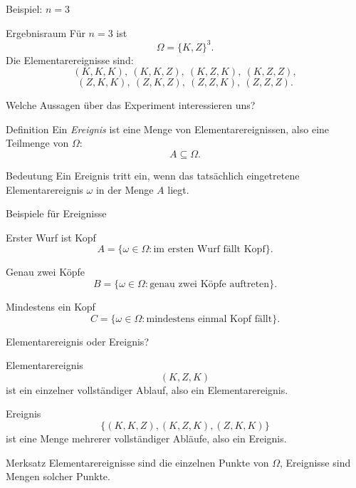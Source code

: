 \documentclass{beamer}
\begin{document}
\begin{frame}{Beispiel: \(n=3\)}
\begin{block}{Ergebnisraum}
Für \(n=3\) ist
\[
\Omega=\{K,Z\}^3.
\]
Die Elementarereignisse sind:
\[
(K,K,K),\ (K,K,Z),\ (K,Z,K),\ (K,Z,Z),
\]
\[
(Z,K,K),\ (Z,K,Z),\ (Z,Z,K),\ (Z,Z,Z).
\]
\end{block}
\end{frame}

\begin{frame}{Welche Aussagen über das Experiment interessieren uns?}
\begin{block}{Definition}
Ein \emph{Ereignis} ist eine Menge von Elementarereignissen, also eine Teilmenge von \(\Omega\):
\[
A\subseteq\Omega.
\]
\end{block}

\begin{block}{Bedeutung}
Ein Ereignis tritt ein, wenn das tatsächlich eingetretene Elementarereignis \(\omega\)
in der Menge \(A\) liegt.
\end{block}
\end{frame}

\begin{frame}{Beispiele für Ereignisse}
\begin{block}{Erster Wurf ist Kopf}
\[
A=\{\omega\in\Omega : \text{im ersten Wurf fällt Kopf}\}.
\]
\end{block}

\begin{block}{Genau zwei Köpfe}
\[
B=\{\omega\in\Omega : \text{genau zwei Köpfe auftreten}\}.
\]
\end{block}

\begin{block}{Mindestens ein Kopf}
\[
C=\{\omega\in\Omega : \text{mindestens einmal Kopf fällt}\}.
\]
\end{block}
\end{frame}

\begin{frame}{Elementarereignis oder Ereignis?}
\begin{block}{Elementarereignis}
\[
(K,Z,K)
\]
ist ein einzelner vollständiger Ablauf, also ein Elementarereignis.
\end{block}

\begin{block}{Ereignis}
\[
\{(K,K,Z),(K,Z,K),(Z,K,K)\}
\]
ist eine Menge mehrerer vollständiger Abläufe, also ein Ereignis.
\end{block}

\begin{block}{Merksatz}
Elementarereignisse sind die einzelnen Punkte von \(\Omega\), Ereignisse sind Mengen solcher Punkte.
\end{block}
\end{frame}
\end{document}
